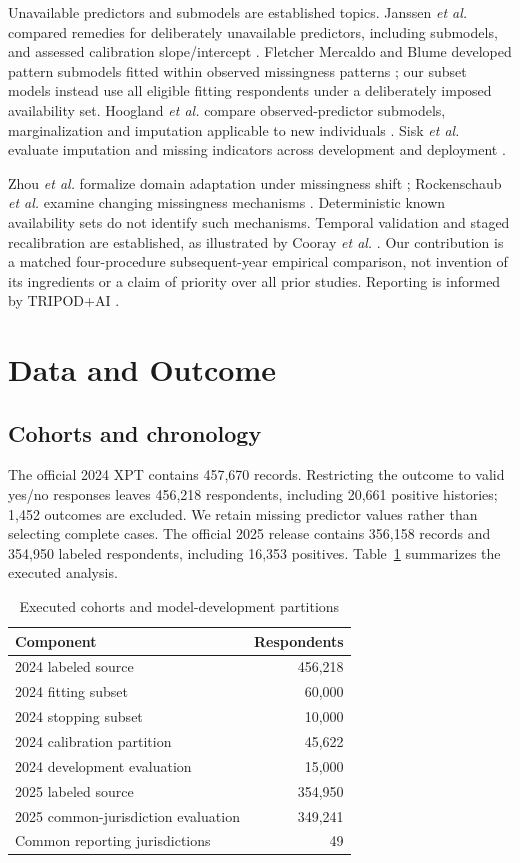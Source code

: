 \documentclass[conference,letterpaper]{IEEEtran}
\begin{document}
Unavailable predictors and submodels are established topics. Janssen \emph{et al.} compared remedies for deliberately unavailable predictors, including submodels, and assessed calibration slope/intercept \cite{janssen}. Fletcher Mercaldo and Blume developed pattern submodels fitted within observed missingness patterns \cite{mercaldo}; our subset models instead use all eligible fitting respondents under a deliberately imposed availability set. Hoogland \emph{et al.} compare observed-predictor submodels, marginalization and imputation applicable to new individuals \cite{hoogland}. Sisk \emph{et al.} evaluate imputation and missing indicators across development and deployment \cite{sisk}.

Zhou \emph{et al.} formalize domain adaptation under missingness shift \cite{zhou}; Rockenschaub \emph{et al.} examine changing missingness mechanisms \cite{rock}. Deterministic known availability sets do not identify such mechanisms. Temporal validation and staged recalibration are established, as illustrated by Cooray \emph{et al.} \cite{cooray}. Our contribution is a matched four-procedure subsequent-year empirical comparison, not invention of its ingredients or a claim of priority over all prior studies. Reporting is informed by TRIPOD+AI \cite{tripod}.

\section{Data and Outcome}
\subsection{Cohorts and chronology}
The official 2024 XPT contains 457,670 records. Restricting the outcome to valid yes/no responses leaves 456,218 respondents, including 20,661 positive histories; 1,452 outcomes are excluded. We retain missing predictor values rather than selecting complete cases. The official 2025 release contains 356,158 records and 354,950 labeled respondents, including 16,353 positives. Table~\ref{tab:cohort} summarizes the executed analysis.

\begin{table}[t]
\caption{Executed cohorts and model-development partitions}
\label{tab:cohort}\centering\small
\begin{tabular}{lr}\toprule
Component & Respondents\\\midrule
2024 labeled source & 456,218\\
2024 fitting subset & 60,000\\
2024 stopping subset & 10,000\\
2024 calibration partition & 45,622\\
2024 development evaluation & 15,000\\
2025 labeled source & 354,950\\
2025 common-jurisdiction evaluation & 349,241\\
Common reporting jurisdictions & 49\\\bottomrule
\end{tabular}
\end{table}
\end{document}
